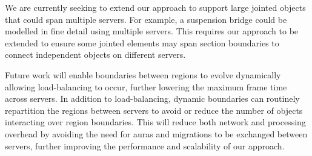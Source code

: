 We are currently seeking to extend our approach to support large jointed objects that could span multiple servers. For example, a suspension bridge could be modelled in fine detail using multiple servers. This requires our approach to be extended to ensure some jointed elements may span section boundaries to connect independent objects on different servers. 

Future work will enable boundaries between regions to evolve dynamically allowing load-balancing to occur, further lowering the maximum frame time across servers. In addition to load-balancing, dynamic boundaries can routinely repartition the regions between servers to avoid or reduce the number of objects interacting over region boundaries. This will reduce both network and processing overhead by avoiding the need for auras and migrations to be exchanged between servers, further improving the performance and scalability of our approach.
